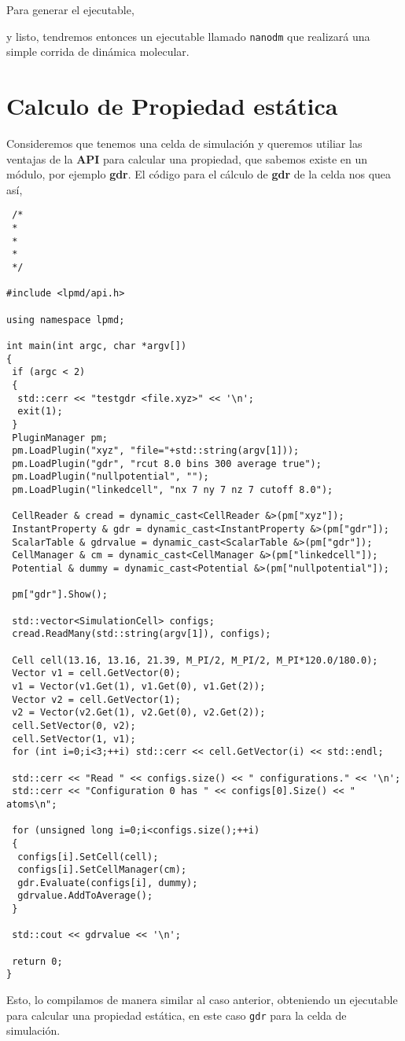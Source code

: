 Para generar el ejecutable,


y listo, tendremos entonces un ejecutable llamado \verb|nanodm| que realizar\'a
una simple corrida de din\'amica molecular.

\section{Calculo de Propiedad est\'atica}

Consideremos que tenemos una celda de simulaci\'on y queremos utiliar las
ventajas de la \textbf{API} para calcular una propiedad, que sabemos existe en
un m\'odulo, por ejemplo \textbf{gdr}. El c\'odigo para el c\'alculo de
\textbf{gdr} de la celda nos quea as\'i,

\begin{verbatim}
 /*
 *
 *
 *
 */

#include <lpmd/api.h>

using namespace lpmd;

int main(int argc, char *argv[])
{
 if (argc < 2) 
 {
  std::cerr << "testgdr <file.xyz>" << '\n';
  exit(1);
 }
 PluginManager pm;
 pm.LoadPlugin("xyz", "file="+std::string(argv[1]));
 pm.LoadPlugin("gdr", "rcut 8.0 bins 300 average true");
 pm.LoadPlugin("nullpotential", "");
 pm.LoadPlugin("linkedcell", "nx 7 ny 7 nz 7 cutoff 8.0");

 CellReader & cread = dynamic_cast<CellReader &>(pm["xyz"]);
 InstantProperty & gdr = dynamic_cast<InstantProperty &>(pm["gdr"]); 
 ScalarTable & gdrvalue = dynamic_cast<ScalarTable &>(pm["gdr"]);
 CellManager & cm = dynamic_cast<CellManager &>(pm["linkedcell"]);
 Potential & dummy = dynamic_cast<Potential &>(pm["nullpotential"]);

 pm["gdr"].Show();

 std::vector<SimulationCell> configs;
 cread.ReadMany(std::string(argv[1]), configs);

 Cell cell(13.16, 13.16, 21.39, M_PI/2, M_PI/2, M_PI*120.0/180.0);
 Vector v1 = cell.GetVector(0);
 v1 = Vector(v1.Get(1), v1.Get(0), v1.Get(2));
 Vector v2 = cell.GetVector(1);
 v2 = Vector(v2.Get(1), v2.Get(0), v2.Get(2));
 cell.SetVector(0, v2);
 cell.SetVector(1, v1);
 for (int i=0;i<3;++i) std::cerr << cell.GetVector(i) << std::endl;

 std::cerr << "Read " << configs.size() << " configurations." << '\n';
 std::cerr << "Configuration 0 has " << configs[0].Size() << " atoms\n";

 for (unsigned long i=0;i<configs.size();++i)
 {
  configs[i].SetCell(cell);
  configs[i].SetCellManager(cm);
  gdr.Evaluate(configs[i], dummy);
  gdrvalue.AddToAverage();
 }

 std::cout << gdrvalue << '\n';

 return 0;
}
\end{verbatim}

Esto, lo compilamos de manera similar al caso anterior, obteniendo un ejecutable
para calcular una propiedad est\'atica, en este caso \verb|gdr| para la celda de
simulaci\'on.
